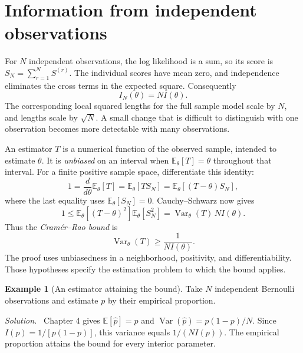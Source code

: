 \documentclass[11pt,oneside,openany]{book}
\theoremstyle{definition}
\newtheorem{example}{Example}[chapter]
\theoremstyle{remark}
\newenvironment{solution}{\par\smallskip\noindent\textit{Solution.}\ }{\par\smallskip}
\newcommand{\E}{\mathbb{E}}
\newcommand{\Var}{\operatorname{Var}}
\numberwithin{equation}{chapter}
\begin{document}
\section{Information from independent observations}
For $N$ independent observations, the log likelihood is a sum, so its score is $S_N=\sum_{r=1}^N S^{(r)}$. The individual scores have mean zero, and independence eliminates the cross terms in the expected square. Consequently
\begin{equation}\label{eq:sampleinformation}
I_N(\theta)=N I(\theta).
\end{equation}
The corresponding local squared lengths for the full sample model scale by $N$, and lengths scale by $\sqrt N$. A small change that is difficult to distinguish with one observation becomes more detectable with many observations.

An estimator $T$ is a numerical function of the observed sample, intended to estimate $\theta$. It is \emph{unbiased} on an interval when $\E_\theta[T]=\theta$ throughout that interval. For a finite positive sample space, differentiate this identity:
\[
1=\frac{d}{d\theta}\E_\theta[T]=\E_\theta[T S_N]
=\E_\theta[(T-\theta)S_N],
\]
where the last equality uses $\E_\theta[S_N]=0$. Cauchy--Schwarz now gives
\[
1\leq\E_\theta[(T-\theta)^2]\E_\theta[S_N^2]
=\Var_\theta(T)\,N I(\theta).
\]
Thus the \emph{Cram\'er--Rao bound} is
\begin{equation}\label{eq:crbound}
\Var_\theta(T)\geq\frac1{NI(\theta)}.
\end{equation}
The proof uses unbiasedness in a neighborhood, positivity, and differentiability. Those hypotheses specify the estimation problem to which the bound applies.

\begin{example}[An estimator attaining the bound]
Take $N$ independent Bernoulli observations and estimate $p$ by their empirical proportion.
\begin{solution}
Chapter 4 gives $\E[\widehat p]=p$ and $\Var(\widehat p)=p(1-p)/N$. Since $I(p)=1/[p(1-p)]$, this variance equals $1/(NI(p))$. The empirical proportion attains the bound for every interior parameter.
\end{solution}
\end{example}
\end{document}
